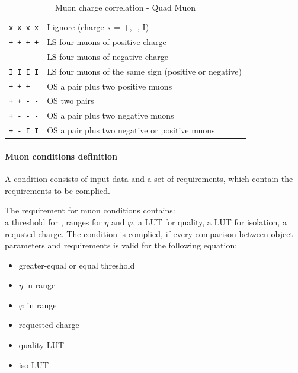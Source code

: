 \begin{table}[ht]
\caption{Muon charge correlation - Quad Muon}
\vspace{5mm}
\centering
\begin{tabular}{|c|l|}\hline
\verb|x x x x| & I  ignore (charge x = +, -, I) \\
\verb|+ + + +| & LS four muons of positive charge \\
\verb|- - - -| & LS four muons of negative charge \\
\verb|I I I I| & LS four muons of the same sign (positive or negative) \\
\verb|+ + + -| & OS a pair plus two positive muons \\
\verb|+ + - -| & OS two pairs \\
\verb|+ - - -| & OS a pair plus two negative muons \\
\verb|+ - I I| & OS a pair plus two negative or positive muons \\\hline
\end{tabular}
\label{tab:gtl:muon_charge_corr_quad}
\end{table}

\clearpage

\paragraph{Muon conditions definition}\label{sec:gtl:muon_cond_def}

A condition consists of input-data and a set of requirements, which contain the requirements to be complied.

The requirement for muon conditions contains:\\
a threshold for \pt, ranges for $\eta$ and $\varphi$, a LUT for quality, a LUT for isolation, 
a requsted charge.
The condition is complied, if every comparison between object parameters and requirements is valid for the following equation:
\begin{itemize}
\item \pt greater-equal or equal threshold
\item $\eta$ in range
\item $\varphi$ in range
\item requested charge 
\item quality LUT
\item iso LUT
\end{itemize}

